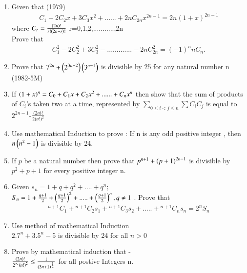 \documentclass[journal,12pt,twocolumn]{IEEEtran}
\theoremstyle{remark}
\begin{document}
    
     \begin{enumerate}
		
             \item Given that  \hfill{(1979)}
		     \begin{align*}
		C_1+2C_2x+3C_3x^2+......+2nC_{2n}x^{2n-1}=2n(1+x)^{2n-1}
		     \end{align*}
		where $ C_r =\frac{\left(2n\right)!}{r!\left(2n-r\right)!}$ r=0,1,2,...........,2n\\
		          Prove that  \begin{align*} 
		     C^2_1-2C_2^2+3C_3^2-.............-2nC_{2n}^2  = (-1)^nnC_n. 
		     \end{align*}  

	      \item Prove that $ 7^{2n} + \left(2^{3n-2}\right)  \left(3^{n-1}\right) $ is divisible by 25 for any natural number n \hfill{(1982-5M)}  


             \item If $ \left(1+x\right)^n= C_0 + C_1x +C_2x^2+......+C_nx^n $ then show that the sum of products of $ C_i $'s taken
	   two at a time, represented by $ \displaystyle\sum_{0 \leq i<j \leq n} \displaystyle\sum C_i C_j $ is equal to $ 2^{2n-1}$-$\frac{\left(2n\right)!} {2\left(n!\right)^2} $ \hfill{}

	     \item Use mathematical Induction to prove : If n is any odd positive integer , then  $ n\left(n^2-1\right) $ is divisible by 24. \hfill{}


	    \item If $ p $ be a natural number then prove that $ p^{n+1}+\left(p+1\right)^{2n-1} $ is divisible by $ p^2+p+1 $ for every positive integer n. \hfill{} 

            \item Given  $ s_n = 1 + q + q^2 +....+q^n;$\\
		    $ S_n = 1 + \frac{q+1}{2}+\left(\frac{q+1}{2}\right)^2+.....+\left(\frac{q+1}{2}\right)^n,q\neq1 $ . Prove that	\begin{align*} 
		    {}^{n+1}C_1+{}^{n+1}C_2s_1+{}^{n+1}C_3s_2+.....+{}^{n+1}C_ns_n=2^nS_n
		    \end{align*}    \hfill{}


	    \item Use method of mathematical Induction \\ $ 2.7^n +3.5^n-5 $ is divisible by 24 for all $ n>0 $ \hfill{}


	    \item Prove by mathematical induction that -\\
		    $ \frac{\left(2n\right)!}{2^{2n}\left(n!\right)^2}\leq \frac{1}{\left(3n+1\right)^{\frac{1}{2}}} $  for all postive Integers n.\hfill {}



\end{enumerate}
\end{document}
